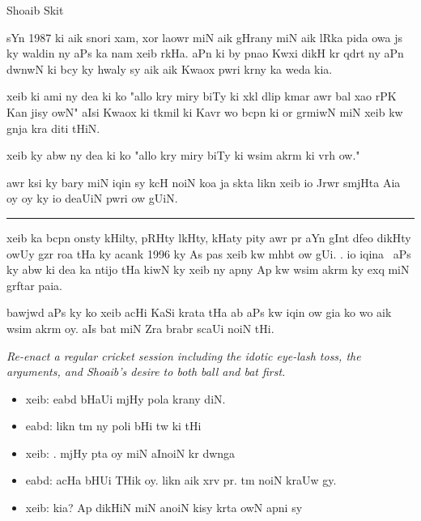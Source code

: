 \documentclass{article}
\begin{document}
\begin{center} \LARGE
	Shoaib Skit
\end{center}

\startUrdu

	sYn 1987 ki aik snori xam, xor laowr miN aik gHrany miN aik lRka pida owa js ky waldin ny aPs ka nam xeib rkHa.
	aPn ki by pnao Kwxi dikH kr qdrt ny aPn dwnwN ki bcy ky hwaly sy aik aik Kwaox pwri krny ka weda kia.


	xeib ki ami ny dea ki ko "allo kry miry biTy ki xkl dlip kmar awr bal xao rPK Kan jisy owN" aIsi Kwaox ki tkmil ki Kavr wo bcpn ki or grmiwN miN xeib kw gnja kra diti tHiN. \hfill {}

	xeib ky abw ny dea ki ko "allo kry miry biTy ki  wsim akrm ki vrh ow."

	awr ksi ky bary miN iqin sy kcH noiN koa ja skta likn xeib io Jrwr smjHta Aia oy oy ky io deaUiN pwri ow gUiN.

\rule{\textwidth}{1pt}

	xeib ka bcpn onsty kHilty, pRHty lkHty,  kHaty pity awr  pr aYn gInt dfeo  dikHty owUy gzr roa tHa ky acank 1996 ky As pas xeib kw mhbt ow gUi.
	.
	io iqina~ aPs ky abw ki dea ka ntijo tHa kiwN ky xeib ny apny Ap kw wsim akrm ky exq miN grftar paia.

	bawjwd aPs ky ko xeib acHi KaSi  krata tHa ab aPs kw iqin ow gia ko wo aik  wsim akrm oy.
	aIs bat miN Zra brabr scaUi noiN tHi.

\begin{enpara}
	\itshape
	Re-enact a regular cricket session including the idotic eye-lash toss, the arguments, and Shoaib's desire to both ball and bat first.
\end{enpara}

	\vspace{0\baselineskip}
	\begin{itemize}
		\item[] xeib:  eabd bHaUi mjHy pola  krany diN.

		\item[] eabd: likn tm ny poli  bHi tw ki tHi\\

		\item[] xeib: . mjHy pta oy miN aInoiN  kr dwnga\\

		\item[] eabd: acHa bHUi THik oy.
					likn aik xrv pr.
					tm  noiN kraUw gy.\\

		\item[] xeib: kia? Ap dikHiN miN anoiN kisy  krta owN apni  sy

	\end{itemize}
\end{document}

